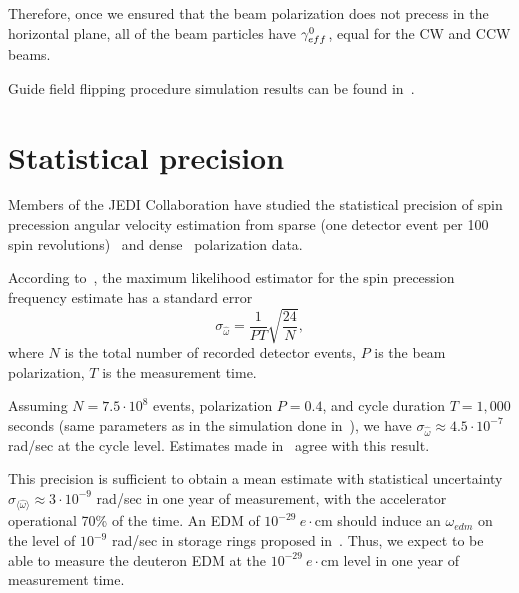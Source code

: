\documentclass[a4paper]{jacow}
\newcommand{\w}{\omega}
\newcommand{\avg}[1]{\langle{#1}\rangle}
\newcommand{\wedm}{\w_{edm}}
\begin{document}
Therefore, once we ensured that the beam polarization does not precess in the horizontal plane,
all of the beam particles have $\g*^0$, equal for the CW and CCW beams.

Guide field flipping procedure simulation results can be found in~\cite{Aksentev:IPAC19:GFF}.


\section{Statistical precision}

Members of the JEDI Collaboration have studied the statistical precision of spin precession angular velocity 
estimation from sparse (one detector event per 100 spin revolutions)~\cite{Pretz:Stats:Sparse} and 
dense~\cite{Aksentev:Stats} polarization data.

According to~\cite{Pretz:Stats:Sparse}, the maximum likelihood estimator for the spin precession frequency
estimate has a standard error 
\[
\sigma_{\hat\w} = \frac{1}{PT}\sqrt{\frac{24}{N}},
\]
where $N$ is the total number of recorded detector events, $P$ is the beam polarization, $T$ is the 
measurement time. 

Assuming $N=7.5\cdot 10^8$ events, polarization $P=0.4$, and cycle duration
$T=1,000$ seconds (same parameters as in the simulation done in~\cite{Aksentev:Stats}),
we have $\sigma_{\hat\w} \approx 4.5\cdot 10^{-7}$ rad/sec at the cycle level. 
Estimates made in~\cite{Aksentev:Stats} agree with this result. 

This precision is sufficient to obtain a mean estimate with statistical uncertainty
 $\sigma_{\avg{\hat\w}} \approx 3\cdot 10^{-9}$ rad/sec in one year of measurement, with
the accelerator operational 70\% of the time. An EDM of $10^{-29}~e\cdot$cm should 
induce an $\wedm$ on the level of $10^{-9}$ rad/sec in storage rings proposed 
in~\cite{Senichev:Lattices}. Thus, we expect to be able to measure the deuteron EDM
at the $10^{-29}~e\cdot$cm level in one year of measurement time.
\end{document}
